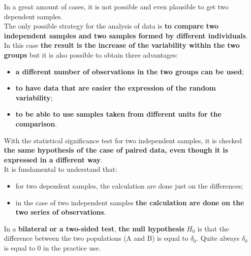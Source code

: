 
\begin{frame}
  \vspace*{.25cm}
  In a great amount of cases, it is not possible and even plausible to get two dependent samples.\\
  The only possible strategy  for the analysis of data is \textbf{to compare two independent samples and two samples formed by different individuals}.\\
  \vspace*{.5cm}
  In this case \textbf{the result is the increase of the variability within the two groups} but it is also possible to obtain three advantages:
  \begin{itemize}
    \item \textbf{a different number of observations in the two groups can be used};
   \item \textbf{to have data that are easier the expression of the random variability};
   \item \textbf{to be able to use samples taken from different units for the comparison}.
\end{itemize}
\end{frame}

\begin{frame}
  \vspace*{.25cm}
  With the statistical significance test for two independent samples, it is checked \textbf{the same hypothesis of the case of paired data, even though it is expressed in a different way}.\\
  \vspace*{.25cm}
  It is fundamental to understand that:\\
  \begin{itemize}
    \item for two dependent samples, the calculation are done just on the differences; 
    \item in the case of two independent samples \textbf{the calculation are done on the two series of observations}.
  \end{itemize}
  \vspace*{.25cm}
  In a  \textbf{bilateral or a two-sided test}, \textbf{the null hypothesis} $ H_0 $ is that the difference between the two populations (A and B) is equal to $ \delta_0 $. Quite always $ \delta_0 $ is equal to 0 in the practice use.
\end{frame}


